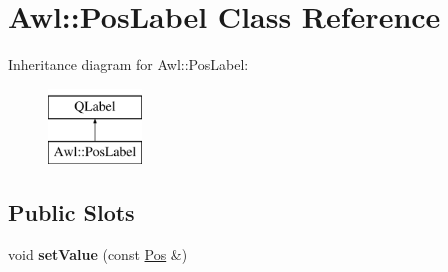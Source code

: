 \hypertarget{class_awl_1_1_pos_label}{}\section{Awl\+:\+:Pos\+Label Class Reference}
\label{class_awl_1_1_pos_label}
Inheritance diagram for Awl\+:\+:Pos\+Label\+:\begin{figure}[H]
\begin{center}
\leavevmode
\includegraphics[height=2.000000cm]{class_awl_1_1_pos_label}
\end{center}
\end{figure}
\subsection*{Public Slots}
\begin{DoxyCompactItemize}
\item 
\mbox{\label{class_awl_1_1_pos_label_ac86bbd69be32052a4b3d4df60d1278f9}} 
void {\bfseries set\+Value} (const \hyperlink{class_ms_1_1_pos}{Pos} \&)
\end{DoxyCompactItemize}
